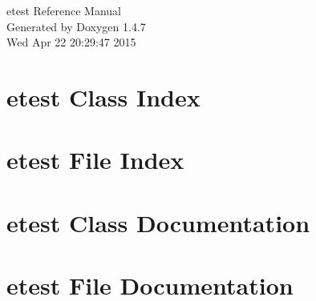 \documentclass[a4paper]{book}
\begin{document}
\begin{titlepage}
\vspace*{7cm}
\begin{center}
{\Large etest Reference Manual}\\
\vspace*{1cm}
{\large Generated by Doxygen 1.4.7}\\
\vspace*{0.5cm}
{\small Wed Apr 22 20:29:47 2015}\\
\end{center}
\end{titlepage}
\clearemptydoublepage
{}
\tableofcontents
\clearemptydoublepage
{}
\chapter{etest Class Index}

\chapter{etest File Index}

\chapter{etest Class Documentation}


\chapter{etest File Documentation}







\printindex
\end{document}
